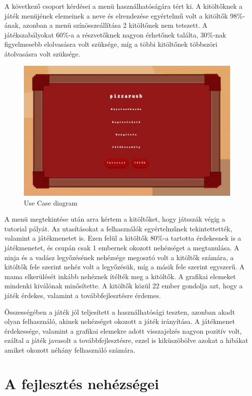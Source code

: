 \documentclass[12pt, a4paper]{report}
\theoremstyle{definition}
\begin{document}
	A következő csoport kérdései a menü használhatóságára tért ki. A kitöltőknek a játék menüjének elemeinek a neve és elrendezése egyértelmű volt a kitöltők 98\%-ának, azonban a menü színösszeállítása 2 kitöltőnek nem tetszett. A játékszabályokat 60\%-a a részvetőknek nagyon érhetőnek találta, 30\%-nak figyelmesebb elolvasásra volt szüksége, míg a többi kitöltőnek többszöri átolvasásra volt szüksége. 
	\begin{figure}[!h]
		\centering
		\includegraphics[width=0.8\linewidth]{./images/menu.jpg}
		\caption{Use Case diagram}
		\label{fig:usecase}
	\end{figure}
	
	A menü megtekintése után arra kértem a kitöltőket, hogy játsszák végig a tutorial pályát. Az utasításokat a felhasználók egyértelműnek tekintettették, valamint a játékmenetet is. Ezen felül a kitöltők 80\%-a tartotta érdekesnek is a játékmenetet, és csupán csak 1 embernek okozott nehézséget a megtanulása. A ninja és a vadász legyőzésének nehézsége megosztó volt a kitöltők számára, a kitöltők fele szerint nehéz volt a legyőzésük, míg a másik fele szerint egyszerű. A mama elkerülését inkább nehéznek ítélték meg a kitöltők. A grafikai elemeket mindenki kiválónak minősítette. A kitöltők közül 22 ember gondolja azt, hogy a játék érdekes, valamint a továbbfejlesztésre érdemes.
	
	Összességében a játék jól teljesített a használhatósági teszten, azonban akadt olyan felhasználó, akinek nehézséget okozott a játék irányítása. A játékmenet érdekessége, valamint a grafikai elemekre adott visszajelzés nagyon pozitív volt, ezáltal a játék javasolt a továbbfejlesztésre, ezzel is kiküszöbölve azokat a hibákat amiket okozott néhány felhasználó számára.

	\section{A fejlesztés nehézségei}
\end{document}
